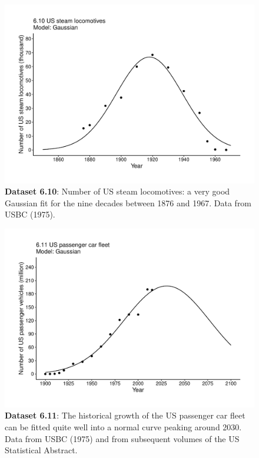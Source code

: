 \documentclass[aps,rmp,preprint,superscriptaddress,10pt,onecolumn]{article}
\begin{document}
\clearpage
\begin{figure}[h]
\includegraphics[width=\textwidth]{output/figs-ggplot/6.10.pdf}
\caption{\textbf{Dataset 6.10}: Number of US steam locomotives: a very good Gaussian fit for the nine decades between 1876 and 1967. Data from USBC (1975). }
\end{figure}
	
\clearpage
\begin{figure}[h]
\includegraphics[width=\textwidth]{output/figs-ggplot/6.11.pdf}
\caption{\textbf{Dataset 6.11}: The historical growth of the US passenger car fleet can be fitted quite well into a normal curve peaking around 2030. Data from USBC (1975) and from subsequent volumes of the US Statistical Abstract. }
\end{figure}
	
\end{document}
